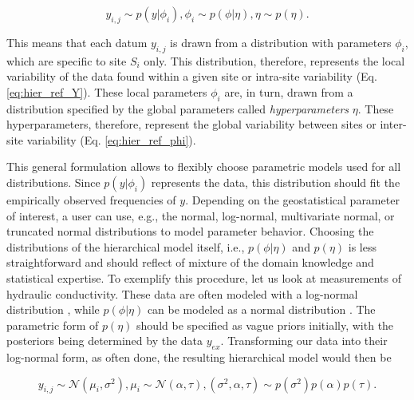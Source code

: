 \begin{subequations}
\label{eq:hier_ref}
    \begin{equation}
    \label{eq:hier_ref_Y}
        y_{i,j} \sim p(y|{\phi_i}),
    \end{equation}
    \begin{equation}
    \label{eq:hier_ref_phi}
        {\phi_i} \sim p({\phi}|{\eta}),
    \end{equation}
    \begin{equation}
    \label{eq:hier_ref_prior}
        {\eta} \sim p({\eta}).
    \end{equation}
\end{subequations}

This means that each datum $y_{i,j}$ is drawn from a distribution with parameters $\phi_i$, which are specific to site $S_i$ only. 
This distribution, therefore, represents the local variability of the data found within a given site or intra-site variability (Eq. \ref{eq:hier_ref_Y}). 
These local parameters ${\phi_i}$ are, in turn, drawn from a distribution specified by the global parameters called \emph{hyperparameters} ${\eta}$. 
These hyperparameters, therefore, represent the global variability between sites or inter-site variability (Eq. \ref{eq:hier_ref_phi}).

This general formulation allows to flexibly choose parametric models used for all distributions. 
Since $p(y|{\phi_i})$ represents the data, this distribution should fit the empirically observed frequencies of $y$. 
Depending on the geostatistical parameter of interest, a user can use, e.g., the normal, log-normal, multivariate normal, or truncated normal distributions to model parameter behavior. 
Choosing the distributions of the hierarchical model itself, i.e., $p({\phi}|{\eta})$ and $p({\eta})$ is less straightforward and should reflect of mixture of the domain knowledge and statistical expertise. 
To exemplify this procedure, let us look at measurements of hydraulic conductivity.
These data are often modeled with a log-normal distribution \citep{Hoeksema1985}, while $p({\phi}|{\eta})$ can be modeled as a normal distribution \citep{Gelman2013}. 
The parametric form of $p({\eta})$ should be specified as vague priors initially, with the posteriors being determined by the data $y_{ex}$. Transforming our data into their log-normal form, as often done, the resulting hierarchical model would then be

\begin{subequations}
\label{eq:hier_ex}
    \begin{equation}
        y_{i,j} \sim \mathcal{N}(\mu_i, \sigma^2),
    \end{equation}
    \begin{equation}
        \mu_i \sim \mathcal{N}(\alpha,\tau),
    \end{equation}
    \begin{equation}
        (\sigma^2, \alpha, \tau) \sim p(\sigma^2)p(\alpha)p(\tau).
    \end{equation}
\end{subequations}

